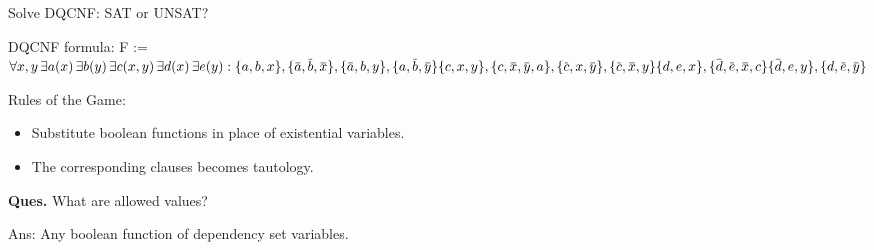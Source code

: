 \documentclass[xcolor=table	]{beamer}
\newcommand{\ov}[1]{\mkern 1.5mu\overline{\mkern-1.5mu#1\mkern-1.5mu}\mkern 1.5mu}
\begin{document}
\begin{frame}{Solve DQCNF: SAT or UNSAT?}


	\begin{alertblock}{DQCNF formula:}
	{		
		F :=	$ \forall x, y \, \exists a(x) \, \exists  b(y) \, \exists c(x,y) \, \exists d(x) \, \exists e(y) :
		\{a,b,x\}, \{\ov{a},\ov{b},\ov{x}\}, \{\ov{a},b,y\}, \{a,\ov{b},\ov{y}\}  \newline 
		\{c,x,y\}, \{c,\ov{x},\ov{y}, a\}, \{\ov{c},x,\ov{y}\}, \{\ov{c},\ov{x},y\} \newline 
		\{d,e,x\}, \{\ov{d},\ov{e},\ov{x}, c\} \{\ov{d},e,y\}, \{d,\ov{e},\ov{y}\} $
	}
\end{alertblock}
\pause

Rules of the Game: \\

\begin{itemize}
	\pause
	
	\item Substitute boolean functions in place of existential variables.
	\pause
	
	\item The corresponding clauses becomes tautology.
\end{itemize}
\pause
 
\textbf{Ques.} What are allowed values? \\
\pause

Ans: Any boolean function of dependency set variables.
\end{frame}
\end{document}
